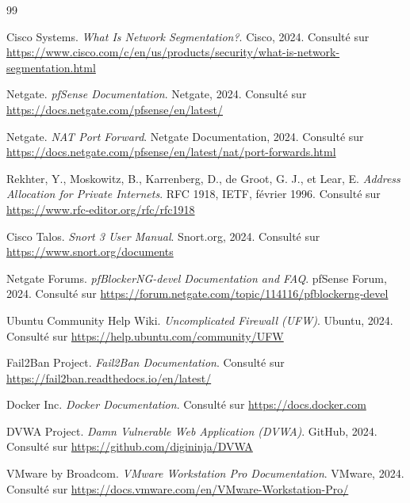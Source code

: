 \documentclass[12pt,a4paper,openany]{report}
\begin{document}
	\begin{thebibliography}{99}
		
		Cisco Systems. \textit{What Is Network Segmentation?}. Cisco, 2024. Consulté sur \url{https://www.cisco.com/c/en/us/products/security/what-is-network-segmentation.html}
		
		Netgate. \textit{pfSense Documentation}. Netgate, 2024. Consulté sur \url{https://docs.netgate.com/pfsense/en/latest/}
		
		Netgate. \textit{NAT Port Forward}. Netgate Documentation, 2024. Consulté sur \url{https://docs.netgate.com/pfsense/en/latest/nat/port-forwards.html}
		
		Rekhter, Y., Moskowitz, B., Karrenberg, D., de Groot, G. J., et Lear, E. \textit{Address Allocation for Private Internets}. RFC 1918, IETF, février 1996. Consulté sur \url{https://www.rfc-editor.org/rfc/rfc1918}
		
		Cisco Talos. \textit{Snort 3 User Manual}. Snort.org, 2024. Consulté sur \url{https://www.snort.org/documents}
		
		Netgate Forums. \textit{pfBlockerNG-devel Documentation and FAQ}. pfSense Forum, 2024. Consulté sur \url{https://forum.netgate.com/topic/114116/pfblockerng-devel}
		
		Ubuntu Community Help Wiki. \textit{Uncomplicated Firewall (UFW)}. Ubuntu, 2024. Consulté sur \url{https://help.ubuntu.com/community/UFW}
		
		Fail2Ban Project. \textit{Fail2Ban Documentation}. Consulté sur \url{https://fail2ban.readthedocs.io/en/latest/}
		
		Docker Inc. \textit{Docker Documentation}. Consulté sur \url{https://docs.docker.com}
		
		DVWA Project. \textit{Damn Vulnerable Web Application (DVWA)}. GitHub, 2024. Consulté sur \url{https://github.com/digininja/DVWA}
		
		VMware by Broadcom. \textit{VMware Workstation Pro Documentation}. VMware, 2024. Consulté sur \url{https://docs.vmware.com/en/VMware-Workstation-Pro/}
		
	\end{thebibliography}
	
\end{document}
